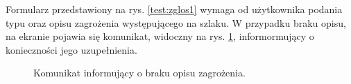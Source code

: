 Formularz przedstawiony na rys. \ref{test:zglos1} wymaga od użytkownika podania typu oraz opisu zagrożenia występującego na szlaku. W przypadku braku opisu, na ekranie pojawia się komunikat, widoczny na rys. \ref{test:zglos2}, informormujący o konieczności jego uzupełnienia.
\setlength{\fboxrule}{0.5pt}
\begin{figure}[H]
    \centering
    \caption{Komunikat informujący o braku opisu zagrożenia.}
    \label{test:zglos2}
\end{figure}

